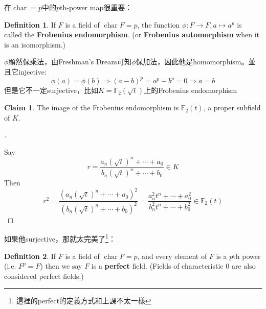 \documentclass[12pt]{article}
\theoremstyle{definition}
\newtheorem{dfn}{Definition}
\newtheorem{prop}{Proposition}
\newtheorem*{clm}{Claim}
\newenvironment{proofs}[1][\proofname]{%
  \begin{proof}[#1]$ $\par\nobreak\ignorespaces
}{%
  \end{proof}
}
\DeclareMathOperator{\Char}{char}
\begin{document}

在$\Char=p$中的$p$th-power map很重要：
\begin{dfn}
	If $F$ is a field of $\Char F=p$, the function $\phi: F\to F, a \mapsto a^p$ is called the \textbf{Frobenius endomorphism}. (or \textbf{Frobenius automorphism} when it is an isomorphism.)
\end{dfn}
$\phi$顯然保乘法，由Freshman's Dream可知$\phi$保加法，因此他是homomorphism。並且它injective:
\[\phi(a)=\phi(b)\Rightarrow (a-b)^p=a^p-b^p=0 \Rightarrow a=b\]
但是它不一定surjective，比如$K = \mathbb{F}_2(\sqrt{t})$上的Frobenius endomorphism
\begin{clm}
	The image of the Frobenius endomorphism is $\mathbb{F}_2(t)$, a proper subfield of $K$.
\end{clm}

\begin{proofs}
	Say
	\[
		r = \frac{a_n (\sqrt{t})^n + \cdots + a_0}{b_n (\sqrt{t})^n + \cdots + b_0} \in K
	\]
	Then
	\[
		r^2 =\frac{\left(a_n (\sqrt{t})^n + \cdots + a_0\right)^2}{\left(b_n (\sqrt{t})^n + \cdots + b_0\right)^2} = \frac{a_n^2 t^n + \cdots + a_0^2}{b_n^2 t^n+ \cdots + b_0^2} \in \mathbb{F}_2(t)
	\]
\end{proofs}


如果他surjective，那就太完美了\footnote{這裡的perfect的定義方式和上課不太一樣}：
\begin{dfn}
	If $F$ is a field of $\Char F=p$, and every element of $F$ is a $p$th power (i.e. $F^p=F$) then we say $F$ is a \textbf{perfect} field.
	(Fields of characteristic $0$ are also considered perfect fields.)
\end{dfn}
\end{document}
